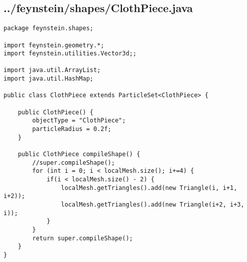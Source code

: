 \subsection*{../feynstein/shapes/ClothPiece.java}
\begin{lstlisting}
package feynstein.shapes;

import feynstein.geometry.*;
import feynstein.utilities.Vector3d;;

import java.util.ArrayList;
import java.util.HashMap;

public class ClothPiece extends ParticleSet<ClothPiece> {
	
	public ClothPiece() {
		objectType = "ClothPiece";
		particleRadius = 0.2f;
	}
   	
    public ClothPiece compileShape() {
		//super.compileShape();
		for (int i = 0; i < localMesh.size(); i+=4) {
			if(i < localMesh.size() - 2) {
				localMesh.getTriangles().add(new Triangle(i, i+1, i+2));
				localMesh.getTriangles().add(new Triangle(i+2, i+3, i));
			}
		}
		return super.compileShape();
    }
}\end{lstlisting}

